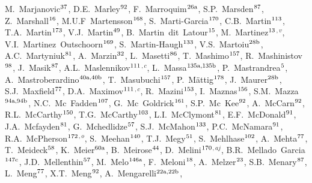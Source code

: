 \begin{flushleft}
M.~Marjanovic$^\textrm{\scriptsize 37}$,
D.E.~Marley$^\textrm{\scriptsize 92}$,
F.~Marroquim$^\textrm{\scriptsize 26a}$,
S.P.~Marsden$^\textrm{\scriptsize 87}$,
Z.~Marshall$^\textrm{\scriptsize 16}$,
M.U.F~Martensson$^\textrm{\scriptsize 168}$,
S.~Marti-Garcia$^\textrm{\scriptsize 170}$,
C.B.~Martin$^\textrm{\scriptsize 113}$,
T.A.~Martin$^\textrm{\scriptsize 173}$,
V.J.~Martin$^\textrm{\scriptsize 49}$,
B.~Martin~dit~Latour$^\textrm{\scriptsize 15}$,
M.~Martinez$^\textrm{\scriptsize 13}$$^{,v}$,
V.I.~Martinez~Outschoorn$^\textrm{\scriptsize 169}$,
S.~Martin-Haugh$^\textrm{\scriptsize 133}$,
V.S.~Martoiu$^\textrm{\scriptsize 28b}$,
A.C.~Martyniuk$^\textrm{\scriptsize 81}$,
A.~Marzin$^\textrm{\scriptsize 32}$,
L.~Masetti$^\textrm{\scriptsize 86}$,
T.~Mashimo$^\textrm{\scriptsize 157}$,
R.~Mashinistov$^\textrm{\scriptsize 98}$,
J.~Masik$^\textrm{\scriptsize 87}$,
A.L.~Maslennikov$^\textrm{\scriptsize 111}$$^{,c}$,
L.~Massa$^\textrm{\scriptsize 135a,135b}$,
P.~Mastrandrea$^\textrm{\scriptsize 5}$,
A.~Mastroberardino$^\textrm{\scriptsize 40a,40b}$,
T.~Masubuchi$^\textrm{\scriptsize 157}$,
P.~M\"attig$^\textrm{\scriptsize 178}$,
J.~Maurer$^\textrm{\scriptsize 28b}$,
S.J.~Maxfield$^\textrm{\scriptsize 77}$,
D.A.~Maximov$^\textrm{\scriptsize 111}$$^{,c}$,
R.~Mazini$^\textrm{\scriptsize 153}$,
I.~Maznas$^\textrm{\scriptsize 156}$,
S.M.~Mazza$^\textrm{\scriptsize 94a,94b}$,
N.C.~Mc~Fadden$^\textrm{\scriptsize 107}$,
G.~Mc~Goldrick$^\textrm{\scriptsize 161}$,
S.P.~Mc~Kee$^\textrm{\scriptsize 92}$,
A.~McCarn$^\textrm{\scriptsize 92}$,
R.L.~McCarthy$^\textrm{\scriptsize 150}$,
T.G.~McCarthy$^\textrm{\scriptsize 103}$,
L.I.~McClymont$^\textrm{\scriptsize 81}$,
E.F.~McDonald$^\textrm{\scriptsize 91}$,
J.A.~Mcfayden$^\textrm{\scriptsize 81}$,
G.~Mchedlidze$^\textrm{\scriptsize 57}$,
S.J.~McMahon$^\textrm{\scriptsize 133}$,
P.C.~McNamara$^\textrm{\scriptsize 91}$,
R.A.~McPherson$^\textrm{\scriptsize 172}$$^{,o}$,
S.~Meehan$^\textrm{\scriptsize 140}$,
T.J.~Megy$^\textrm{\scriptsize 51}$,
S.~Mehlhase$^\textrm{\scriptsize 102}$,
A.~Mehta$^\textrm{\scriptsize 77}$,
T.~Meideck$^\textrm{\scriptsize 58}$,
K.~Meier$^\textrm{\scriptsize 60a}$,
B.~Meirose$^\textrm{\scriptsize 44}$,
D.~Melini$^\textrm{\scriptsize 170}$$^{,aj}$,
B.R.~Mellado~Garcia$^\textrm{\scriptsize 147c}$,
J.D.~Mellenthin$^\textrm{\scriptsize 57}$,
M.~Melo$^\textrm{\scriptsize 146a}$,
F.~Meloni$^\textrm{\scriptsize 18}$,
A.~Melzer$^\textrm{\scriptsize 23}$,
S.B.~Menary$^\textrm{\scriptsize 87}$,
L.~Meng$^\textrm{\scriptsize 77}$,
X.T.~Meng$^\textrm{\scriptsize 92}$,
A.~Mengarelli$^\textrm{\scriptsize 22a,22b}$,
$$
\end{flushleft}
